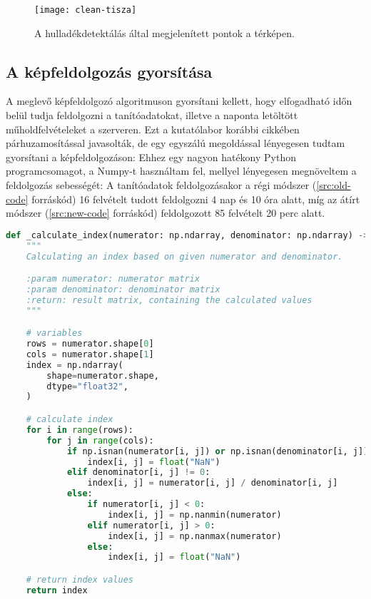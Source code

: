 \begin{figure}[H]
	\centering
	\texttt{[image: clean-tisza]}
	\caption{A hulladékdetektálás által megjelenített pontok a térképen.}
    \label{fig:clean-tisza}
\end{figure}

\subsection{A képfeldolgozás gyorsítása}
A meglevő képfeldolgozó algoritmuson gyorsítani kellett, hogy elfogadható időn belül tudja feldolgozni a tanítóadatokat, illetve a naponta letöltött műholdfelvételeket a szerveren. Ezt a kutatólabor korábbi cikkében párhuzamosítással javasolták, de egy egyszálú megoldással lényegesen tudtam gyorsítani a képfeldolgozáson: Ehhez egy nagyon hatékony Python programcsomagot, a Numpy-t \cite{harris2020array} használtam fel, mellyel lényegesen megnöveltem a feldolgozás sebességét: A tanítóadatok feldolgozásakor a régi módszer (\ref{src:old-code} forráskód) 16 felvételt tudott feldolgozni 4 nap és 10 óra alatt, míg az átírt módszer (\ref{src:new-code} forráskód) feldolgozott 85 felvételt 20 perc alatt.

\begin{lstlisting}[language={Python}]
def _calculate_index(numerator: np.ndarray, denominator: np.ndarray) -> np.ndarray:
    """
    Calculating an index based on given numerator and denominator.

    :param numerator: numerator matrix
    :param denominator: denominator matrix
    :return: result matrix, containing the calculated values
    """

    # variables
    rows = numerator.shape[0]
    cols = numerator.shape[1]
    index = np.ndarray(
        shape=numerator.shape,
        dtype="float32",
    )

    # calculate index
    for i in range(rows):
        for j in range(cols):
            if np.isnan(numerator[i, j]) or np.isnan(denominator[i, j]):
                index[i, j] = float("NaN")
            elif denominator[i, j] != 0:
                index[i, j] = numerator[i, j] / denominator[i, j]
            else:
                if numerator[i, j] < 0:
                    index[i, j] = np.nanmin(numerator)
                elif numerator[i, j] > 0:
                    index[i, j] = np.nanmax(numerator)
                else:
                    index[i, j] = float("NaN")

    # return index values
    return index
\end{lstlisting}

